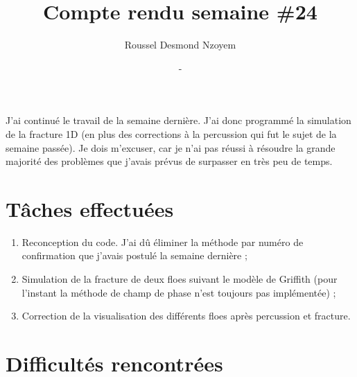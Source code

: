 \documentclass[
  french,
	11pt, %
]{fphw}
\title{\sf\bfseries Compte rendu semaine \#24} %
\author{Roussel Desmond Nzoyem} %
\date{\DTMdisplaydate{2021}{7}{14}{-1} - \DTMdisplaydate{2021}{7}{20}{-1}} %
\institute{Sorbonne Université \\ Laboratoire Jacques-Louis Lions} %
\begin{document}
\maketitle %



J'ai continué le travail de la semaine dernière. J'ai donc programmé la simulation de la fracture 1D (en plus des corrections à la percussion qui fut le sujet de la semaine passée). Je dois m'excuser, car je n'ai pas réussi à résoudre la grande majorité des problèmes que j'avais prévus de surpasser en très peu de temps.


\section*{Tâches effectuées}


\begin{enumerate}
  \item Reconception du code. J'ai dû éliminer la méthode par numéro de confirmation que j'avais postulé la semaine dernière ;
  \item Simulation de la fracture de deux floes suivant le modèle de Griffith (pour l'instant la méthode de champ de phase n'est toujours pas implémentée) ;
  \item Correction de la visualisation des différents floes après percussion et fracture.
\end{enumerate}


 

\section*{Difficultés rencontrées}
\end{document}
